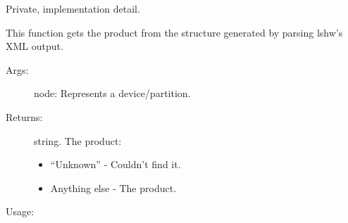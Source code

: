 \documentclass[letterpaper,10pt,english]{sphinxmanual}
\begin{document}
\begin{fulllineitems}
\label{\detokenize{linux:getdevinfo.linux.get_product}}
Private, implementation detail.

This function gets the product from the structure generated
by parsing lshw’s XML output.
\begin{description}
\item[{Args:}] \leavevmode
node:   Represents a device/partition.

\item[{Returns:}] \leavevmode
string. The product:
\begin{itemize}
\item {} 
“Unknown”     - Couldn’t find it.

\item {} 
Anything else - The product.

\end{itemize}

\end{description}

Usage:

\begin{sphinxVerbatim}[commandchars=\\\{\}]
  
\end{sphinxVerbatim}

\end{fulllineitems}

\end{document}
